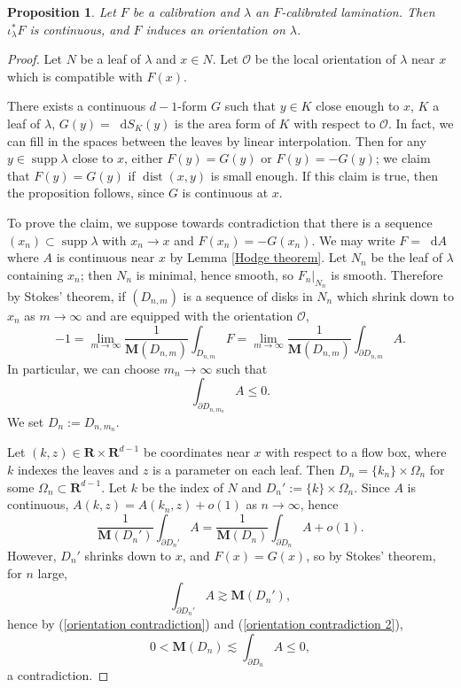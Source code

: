 \documentclass[reqno,11pt]{amsart}
\newcommand{\RR}{\mathbf{R}}
\newcommand*\dif{\mathop{}\!\mathrm{d}}
\DeclareMathOperator{\dist}{dist}
\DeclareMathOperator{\supp}{supp}
\newcommand{\Mass}{\mathbf M}
\newtheorem{proposition}[theorem]{Proposition}
\theoremstyle{definition}
\numberwithin{equation}{section}
\begin{document}
\begin{proposition}\label{calibrated implies oriented}
Let $F$ be a calibration and $\lambda$ an $F$-calibrated lamination.
Then $\iota_\lambda^* F$ is continuous, and $F$ induces an orientation on $\lambda$.
\end{proposition}
\begin{proof}
Let $N$ be a leaf of $\lambda$ and $x \in N$.
Let $\mathscr O$ be the local orientation of $\lambda$ near $x$ which is compatible with $F(x)$. 

There exists a continuous $d - 1$-form $G$ such that $y \in K$ close enough to $x$, $K$ a leaf of $\lambda$, $G(y) = \dif S_K(y)$ is the area form of $K$ with respect to $\mathscr O$.
In fact, we can fill in the spaces between the leaves by linear interpolation.
Then for any $y \in \supp \lambda$ close to $x$, either $F(y) = G(y)$ or $F(y) = -G(y)$; we claim that $F(y) = G(y)$ if $\dist(x, y)$ is small enough.
If this claim is true, then the proposition follows, since $G$ is continuous at $x$.

To prove the claim, we suppose towards contradiction that there is a sequence $(x_n) \subset \supp \lambda$ with $x_n \to x$ and $F(x_n) = -G(x_n)$.
We may write $F = \dif A$ where $A$ is continuous near $x$ by Lemma \ref{Hodge theorem}.
Let $N_n$ be the leaf of $\lambda$ containing $x_n$; then $N_n$ is minimal, hence smooth, so $F_n|_{N_n}$ is smooth.
Therefore by Stokes' theorem, if $(D_{n, m})$ is a sequence of disks in $N_n$ which shrink down to $x_n$ as $m \to \infty$ and are equipped with the orientation $\mathscr O$,
$$-1 = \lim_{m \to \infty} \frac{1}{\Mass(D_{n, m})} \int_{D_{n, m}} F = \lim_{m \to \infty} \frac{1}{\Mass(D_{n, m})} \int_{\partial D_{n, m}} A.$$
In particular, we can choose $m_n \to \infty$ such that 
\begin{equation}\label{orientation contradiction}
\int_{\partial D_{n, m_n}} A \leq 0.
\end{equation}
We set $D_n := D_{n, m_n}$.

Let $(k, z) \in \RR \times \RR^{d - 1}$ be coordinates near $x$ with respect to a flow box, where $k$ indexes the leaves and $z$ is a parameter on each leaf.
Then $D_n = \{k_n\} \times \Omega_n$ for some $\Omega_n \subset \RR^{d - 1}$.
Let $k$ be the index of $N$ and $D_n' := \{k\} \times \Omega_n$.
Since $A$ is continuous, $A(k, z) = A(k_n, z) + o(1)$ as $n \to \infty$, hence
\begin{equation}\label{orientation contradiction 2}
\frac{1}{\Mass(D_n')} \int_{\partial D_n'} A = \frac{1}{\Mass(D_n)} \int_{\partial D_n} A + o(1).
\end{equation}
However, $D_n'$ shrinks down to $x$, and $F(x) = G(x)$, so by Stokes' theorem, for $n$ large,
$$\int_{\partial D_n'} A \gtrsim \Mass(D_n'),$$
hence by (\ref{orientation contradiction}) and (\ref{orientation contradiction 2}),
$$0 < \Mass(D_n) \lesssim \int_{\partial D_n} A \leq 0,$$
a contradiction.
\end{proof}
\end{document}

